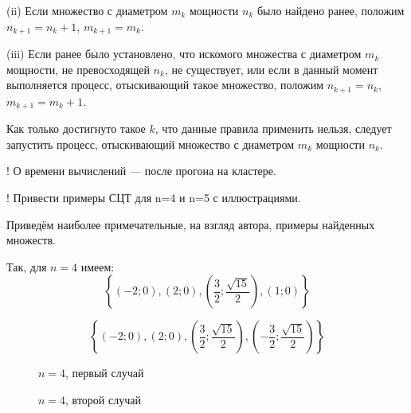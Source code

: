 \documentclass{article}
\begin{document}
(ii)
Если множество с диаметром $m_k$ мощности $n_k$ было найдено ранее, положим $n_{k+1} = n_k +1$, $m_{k+1} = m_k$.

(iii)
Если ранее было установлено, что искомого множества с диаметром $m_k$ мощности, не превосходящей $n_k$, не существует,
или если в данный момент выполняется процесс, отыскивающий такое множество, положим $n_{k+1} = n_k$, $m_{k+1} = m_k+1$.

Как только достигнуто такое $k$, что данные правила применить нельзя, следует запустить процесс, отыскивающий множество с диаметром $m_k$ мощности $n_k$.




! О времени вычислений --- после прогона на кластере.

! Привести примеры СЦТ для n=4 и n=5 с иллюстрациями.


Приведём наиболее примечательные, на взгляд автора, примеры найденных множеств.

Так, для $n=4$ имеем:
$$
\left\{\left( -2 ; 0\right),\left( 2 ; 0\right),\left( \frac{3}{2} ; \frac{\sqrt{15}}{2}\right),\left( 1 ; 0\right)\right\}
$$

$$
\left\{\left( -2 ; 0\right),\left( 2 ; 0\right),\left( \frac{3}{2} ; \frac{\sqrt{15}}{2}\right),\left( -\frac{3}{2} ; \frac{\sqrt{15}}{2}\right)\right\}
$$


\begin{figure}[h]
\caption{$n=4$, первый случай}
\label{ris:image}
\end{figure}

\begin{figure}[h]
\caption{$n=4$, второй случай}
\label{ris:image}
\end{figure}
\end{document}

